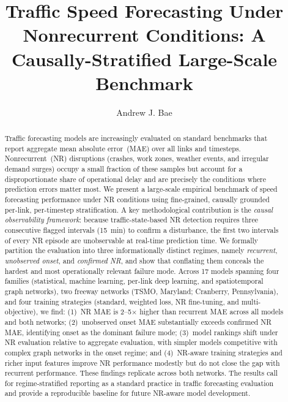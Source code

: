 \documentclass[a4paper]{cas-sc}
\begin{document}
\title{Traffic Speed Forecasting Under Nonrecurrent Conditions:
       A Causally-Stratified Large-Scale Benchmark}

\author[1]{Andrew J. Bae\cormark[1]}

\address[1]{Department of Civil and Environmental Engineering,
            Carnegie Mellon University, Pittsburgh, PA, USA}

\begin{abstract}
Traffic forecasting models are increasingly evaluated on standard
benchmarks that report aggregate mean absolute error~(MAE) over all
links and timesteps.
Nonrecurrent~(NR) disruptions (crashes, work zones, weather events,
and irregular demand surges) occupy a small fraction of these samples
but account for a disproportionate share of operational delay and are
precisely the conditions where prediction errors matter most.
We present a large-scale empirical benchmark of speed
forecasting performance under NR conditions using fine-grained,
causally grounded per-link, per-timestep stratification.
A key methodological contribution is the \emph{causal observability
framework}: because traffic-state-based NR detection requires three
consecutive flagged intervals (15~min) to confirm a disturbance, the
first two intervals of every NR episode are unobservable at real-time
prediction time.
We formally partition the evaluation into three informationally
distinct regimes, namely \emph{recurrent}, \emph{unobserved onset},
and \emph{confirmed NR}, and show that conflating them conceals the
hardest and most operationally relevant failure mode.
Across 17 models spanning four families (statistical, machine learning,
per-link deep learning, and spatiotemporal graph networks), two
freeway networks (TSMO, Maryland; Cranberry, Pennsylvania), and four
training strategies (standard, weighted loss, NR fine-tuning, and
multi-objective), we find: (1)~NR MAE is 2--5$\times$ higher than
recurrent MAE across all models and both networks; (2)~unobserved
onset MAE substantially exceeds confirmed NR MAE, identifying onset
as the dominant failure mode; (3)~model rankings shift under NR
evaluation relative to aggregate evaluation, with simpler models
competitive with complex graph networks in the onset regime; and
(4)~NR-aware training strategies and richer input features improve
NR performance modestly but do not close the gap with recurrent
performance.
These findings replicate across both networks.
The results call for regime-stratified reporting as a standard
practice in traffic forecasting evaluation and provide a
reproducible baseline for future NR-aware model development.
\end{abstract}
\end{document}

